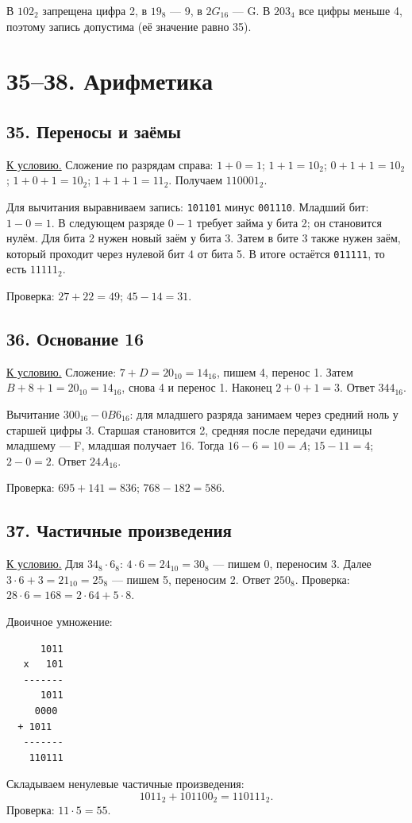 В $102_2$ запрещена цифра 2, в $19_8$ --- 9, в $2G_{16}$ --- G. В $203_4$ все цифры меньше 4, поэтому запись допустима (её значение равно 35).

\section{З5--З8. Арифметика}
\subsection*{З5. Переносы и заёмы}\label{sol:z5}
\hyperref[task:z5]{К условию.}
Сложение по разрядам справа: $1+0=1$; $1+1=10_2$; $0+1+1=10_2$; $1+0+1=10_2$; $1+1+1=11_2$. Получаем $110001_2$.

Для вычитания выравниваем запись: \texttt{101101} минус \texttt{001110}. Младший бит: $1-0=1$. В следующем разряде $0-1$ требует займа у бита 2; он становится нулём. Для бита 2 нужен новый заём у бита 3. Затем в бите 3 также нужен заём, который проходит через нулевой бит 4 от бита 5. В итоге остаётся \texttt{011111}, то есть $11111_2$.

Проверка: $27+22=49$; $45-14=31$.

\subsection*{З6. Основание 16}\label{sol:z6}
\hyperref[task:z6]{К условию.}
Сложение: $7+D=20_{10}=14_{16}$, пишем 4, перенос 1. Затем $B+8+1=20_{10}=14_{16}$, снова 4 и перенос 1. Наконец $2+0+1=3$. Ответ $344_{16}$.

Вычитание $300_{16}-0B6_{16}$: для младшего разряда занимаем через средний ноль у старшей цифры 3. Старшая становится 2, средняя после передачи единицы младшему --- F, младшая получает 16. Тогда $16-6=10=A$; $15-11=4$; $2-0=2$. Ответ $24A_{16}$.

Проверка: $695+141=836$; $768-182=586$.

\subsection*{З7. Частичные произведения}\label{sol:z7}
\hyperref[task:z7]{К условию.}
Для $34_8\cdot6_8$: $4\cdot6=24_{10}=30_8$ --- пишем 0, переносим 3. Далее $3\cdot6+3=21_{10}=25_8$ --- пишем 5, переносим 2. Ответ $250_8$. Проверка: $28\cdot6=168=2\cdot64+5\cdot8$.

Двоичное умножение:
\begin{verbatim}
      1011
   x   101
   -------
      1011
     0000
  + 1011
   -------
    110111
\end{verbatim}
Складываем ненулевые частичные произведения:
\[
1011_2+101100_2=110111_2.
\]
Проверка: $11\cdot5=55$.


